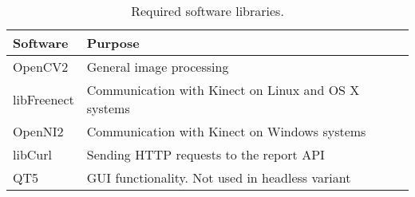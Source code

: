 \begin{table} [hbt]
\begin{center}
  \begin{tabular}{ | l | l | }
    \hline
    \textbf{Software} & \textbf{Purpose} \\ \hline
    OpenCV2 & General image processing  \\ \hline
    libFreenect & Communication with Kinect on Linux and OS X systems  \\ \hline
    OpenNI2 & Communication with Kinect on Windows systems  \\ \hline
    libCurl & Sending HTTP requests to the report API \\ \hline
    QT5 & GUI functionality. Not used in headless variant \\ \hline
  \end{tabular}
  \label{reqSoftware}
  \caption{Required software libraries.}
\end{center}
\end{table}